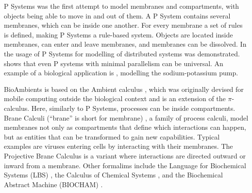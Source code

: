 P Systems \cite{psystems} was the first attempt to model membranes and compartments, with objects being able to move in and out of them. A P System contains several membranes, which can be inside one another. For every membrane a set of rules is defined, making P Systems a rule-based system. Objects are located inside membranes, can enter and leave membranes, and membranes can be dissolved. In \cite{CIOBANU2003123} the usage of P Systems for modelling of distributed systems was demonstrated. \cite{CIOBANU2007117} shows that even P systems with minimal parallelism can be universal. An example of a biological application is \cite{10.1007/978-3-540-31837-8_12}, modelling the sodium-potassium pump. 

BioAmbients \cite{RegevBioambients} is based on the Ambient calculus \cite{CARDELLI2000177}, which was originally devised for mobile computing outside the biological context and is an extension of the $\pi$-calculus. Here, similarly to P Systems, processes can be inside compartments.%
Brane Calculi (``brane'' is short for membrane) \cite{CardelliBraneCalculi}, a family of process calculi, model membranes not only as compartments that define which interactions can happen, but as entities that can be transformed to gain new capabilities. Typical examples are viruses entering cells by interacting with their membranes. The Projective Brane Calculus \cite{ProjectiveBrane} is a variant where interactions are directed outward or inward from a membrane. Other formalims include the Language for Biochemical Systems (LBS) \cite{PlotkinLBS}, the Calculus of Chemical Systems \cite{PlotkinCCS}, and the Biochemical Abstract Machine (BIOCHAM) \cite{biocham}. 

